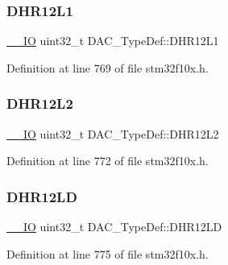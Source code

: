 \mbox{\label{struct_d_a_c___type_def_a5eb63912e39085e3e13d64bdb0cf38bd}} 
\subsubsection{\texorpdfstring{D\+H\+R12\+L1}{DHR12L1}}
{\footnotesize\ttfamily \hyperlink{core__sc300_8h_aec43007d9998a0a0e01faede4133d6be}{\+\_\+\+\_\+\+IO} uint32\+\_\+t D\+A\+C\+\_\+\+Type\+Def\+::\+D\+H\+R12\+L1}



Definition at line 769 of file stm32f10x.\+h.

\mbox{\label{struct_d_a_c___type_def_a9f612b6b3e065e810e5a2fb254d6a40b}} 
\subsubsection{\texorpdfstring{D\+H\+R12\+L2}{DHR12L2}}
{\footnotesize\ttfamily \hyperlink{core__sc300_8h_aec43007d9998a0a0e01faede4133d6be}{\+\_\+\+\_\+\+IO} uint32\+\_\+t D\+A\+C\+\_\+\+Type\+Def\+::\+D\+H\+R12\+L2}



Definition at line 772 of file stm32f10x.\+h.

\mbox{\label{struct_d_a_c___type_def_aea4d055e3697999b44cdcf2702d79d40}} 
\subsubsection{\texorpdfstring{D\+H\+R12\+LD}{DHR12LD}}
{\footnotesize\ttfamily \hyperlink{core__sc300_8h_aec43007d9998a0a0e01faede4133d6be}{\+\_\+\+\_\+\+IO} uint32\+\_\+t D\+A\+C\+\_\+\+Type\+Def\+::\+D\+H\+R12\+LD}



Definition at line 775 of file stm32f10x.\+h.

